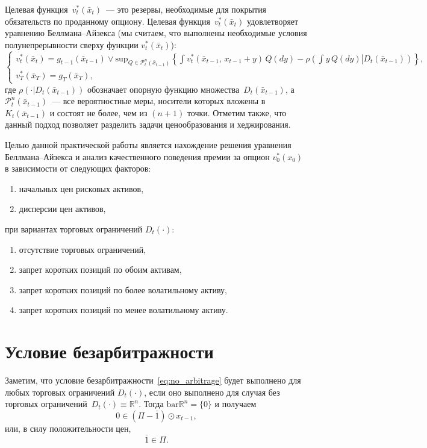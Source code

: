 \documentclass[a4paper, 12pt]{article}
\theoremstyle{def}
\theoremstyle{th}
\theoremstyle{rem}
\begin{document}
    Целевая функция~$v^*_t(\bar x_t)$~--- это резервы, необходимые для покрытия обязательств по проданному опциону. Целевая функция~$v^*_t(\bar x_t)$ удовлетворяет уравнению Беллмана--Айзекса (мы считаем, что выполнены необходимые условия полунепрерывности сверху функции $v^*_t(\bar x_t)$):
    \begin{equation} \label{eq:bellman-ajzeks}
        \begin{cases}
            v^*_t(\bar x_t) = g_{t-1}(\bar x_{t-1}) \lor \mathrm{sup}_{Q \in \mathcal{P}_t^n(\bar x_{t-1})} \left\{
                \int v_t^*(\bar x_{t-1},\, x_{t-1}+y)\,Q(dy)
                -
                \rho\left(
                    \left. \int y\,Q(dy)
                    \right|
                    D_t(\bar x_{t-1})
                \right)
            \right\}, \\
            v_T^*(\bar x_T) = g_T(\bar x_T),
        \end{cases}
    \end{equation}
    где $\rho\left(\cdot\left| D_t(\bar x_{t-1}) \right.\right)$ обозначает опорную функцию множества~$D_t(\bar x_{t-1})$, а $\mathcal{P}_t^n(\bar x_{t-1})$~--- все вероятностные меры, носители которых вложены в~$K_t(\bar x_{t-1})$ и состоят не более, чем из $(n+1)$ точки. Отметим также, что данный подход позволяет разделить задачи ценообразования и хеджирования.

    Целью данной практической работы является нахождение решения уравнения Белл\-мана--Айзекса и анализ качественного поведения премии за опцион $v_0^*(x_0)$ в зависимости от следующих факторов:
    \begin{enumerate}
        \item начальных цен рисковых активов,
        \item дисперсии цен активов,
    \end{enumerate}
    при вариантах торговых ограничений $D_t(\cdot)$:
    \begin{enumerate}
        \item отсутствие торговых ограничений,
        \item запрет коротких позиций по обоим активам,
        \item запрет коротких позиций по более волатильному активу,
        \item запрет коротких позиций по менее волатильному активу.
    \end{enumerate}


    \section{Условие безарбитражности}
    Заметим, что условие безарбитражности~\eqref{eq:no_arbitrage} будет выполнено для любых торговых ограничений $D_t(\cdot)$, если оно выполнено для случая без торговых ограничений~$D_t(\cdot) \equiv \mathbb{R}^n$. Тогда $\mathrm{bar}\mathbb{R}^n = \{0\}$ и получаем
    \begin{equation}
        0 \in (\Pi - \bar 1) \odot x_{t-1},
    \end{equation}
    или, в силу положительности цен,
    \begin{equation}
        \bar 1 \in \Pi.
    \end{equation}
\end{document}
